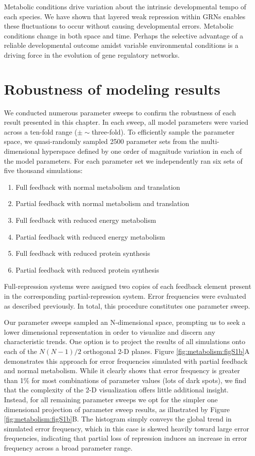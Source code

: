 Metabolic conditions drive variation about the intrinsic developmental tempo of each species. We have shown that layered weak repression within GRNs enables these fluctuations to occur without causing developmental errors. Metabolic conditions change in both space and time. Perhaps the selective advantage of a reliable developmental outcome amidst variable environmental conditions is a driving force in the evolution of gene regulatory networks.

\section{Robustness of modeling results}
\label{metabolism:robust}

We conducted numerous parameter sweeps to confirm the robustness of each result presented in this chapter. In each sweep, all model parameters were varied across a ten-fold range ($\pm \sim$three-fold). To efficiently sample the parameter space, we quasi-randomly sampled 2500 parameter sets from the multi-dimensional hyperspace defined by one order of magnitude variation in each of the model parameters. For each parameter set we independently ran six sets of five thousand simulations: 
\begin{enumerate}
	\item Full feedback with normal metabolism and translation
	\item Partial feedback with normal metabolism and translation
	\item Full feedback with reduced energy metabolism
	\item Partial feedback with reduced energy metabolism
	\item Full feedback with reduced protein synthesis	
	\item Partial feedback with reduced protein synthesis
\end{enumerate}
Full-repression systems were assigned two copies of each feedback element present in the corresponding partial-repression system. Error frequencies were evaluated as described previously. In total, this procedure constitutes one parameter sweep. 

Our parameter sweeps sampled an N-dimensional space, prompting us to seek a lower dimensional representation in order to visualize and discern any characteristic trends. One option is to project the results of all simulations onto each of the $N(N-1)/2$ orthogonal 2-D planes. Figure \ref{fig:metabolism:figS1b}A demonstrates this approach for error frequencies simulated with partial feedback and normal metabolism. While it clearly shows that error frequency is greater than 1\% for most combinations of parameter values (lots of dark spots), we find that the complexity of the 2-D visualization offers little additional insight. Instead, for all remaining parameter sweeps we opt for the simpler one dimensional projection of parameter sweep results, as illustrated by Figure \ref{fig:metabolism:figS1b}B. The histogram simply conveys the global trend in simulated error frequency, which in this case is skewed heavily toward large error frequencies, indicating that partial loss of repression induces an increase in error frequency across a broad parameter range. 

